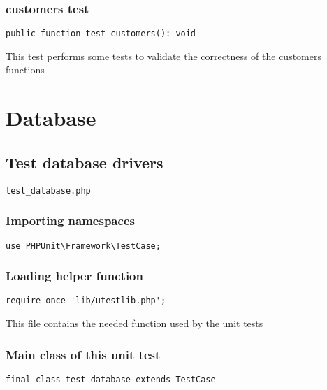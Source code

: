 \documentclass[a4paper]{article}
\begin{document}
\subsubsection{customers test}

\begin{lstlisting}
public function test_customers(): void
\end{lstlisting}

This test performs some tests to validate the correctness
of the customers functions


\hypertarget{toc128}{}
\section{Database}

\hypertarget{toc129}{}
\subsection{Test database drivers}

\begin{lstlisting}
test_database.php
\end{lstlisting}

\hypertarget{toc130}{}
\subsubsection{Importing namespaces}

\begin{lstlisting}
use PHPUnit\Framework\TestCase;
\end{lstlisting}

\hypertarget{toc131}{}
\subsubsection{Loading helper function}

\begin{lstlisting}
require_once 'lib/utestlib.php';
\end{lstlisting}

This file contains the needed function used by the unit tests

\hypertarget{toc132}{}
\subsubsection{Main class of this unit test}

\begin{lstlisting}
final class test_database extends TestCase
\end{lstlisting}
\end{document}
